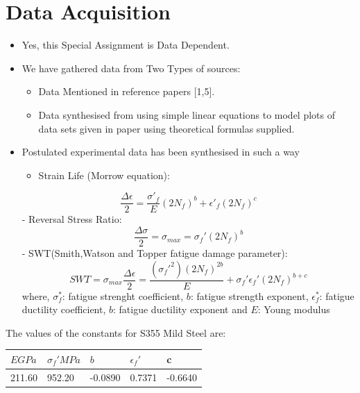 \documentclass[11pt]{article}
\providecommand{\tightlist}{%
      \setlength{\itemsep}{0pt}\setlength{\parskip}{0pt}}
\begin{document}
\hypertarget{data-acquisition}{%
\section{Data Acquisition}\label{data-acusition}}

\begin{itemize}
\tightlist
\item
  Yes, this Special Assignment is Data Dependent.
\item
  We have gathered data from Two Types of sources:

  \begin{itemize}
  \tightlist
  \item
    Data Mentioned in reference papers {[}1,5{]}.
  \item
    Data synthesised from using simple linear equations to model plots
    of data sets given in paper using theoretical formulas supplied.

    \begin{itemize}
    \tightlist
    
  \end{itemize}
\end{itemize}
\item
      Postulated experimental data has been synthesised in such a way


\begin{itemize}
\tightlist
\item
  Strain Life (Morrow equation):
\end{itemize}

\[
\frac{\Delta \epsilon}{2} = \frac{\sigma'_f}{E}(2N_f)^b + \epsilon'_f(2N_f)^c
\] - Reversal Stress Ratio: \[
\frac{\Delta \sigma}{2} = \sigma_{max} = \sigma_f'(2N_f)^b 
\] - SWT(Smith,Watson and Topper fatigue damage parameter): \[
SWT = \sigma_{max}\frac{\Delta\epsilon}{2} = \frac{(\sigma_f'^2)(2N_f)^{2b}}{E} + \sigma_f'\epsilon_f'(2N_f)^{b+c}
\] where, \(\sigma^*_f\): fatigue strenght coefficient, \(b\): fatigue
strength exponent, \(\epsilon^*_f\): fatigue ductility coefficient,
\(b\): fatigue ductility exponent and \(E\): Young modulus
\end{itemize}
The values of the constants for S355 Mild Steel are:

\begin{longtable}[]{@{}lllll@{}}
\toprule
\(E GPa\) & \(\sigma_f' MPa\) & \(b\) & \(\epsilon_f'\) &
c\tabularnewline
\midrule
\endhead
211.60 & 952.20 & -0.0890 & 0.7371 & -0.6640\tabularnewline
\bottomrule
\end{longtable}
\end{document}
